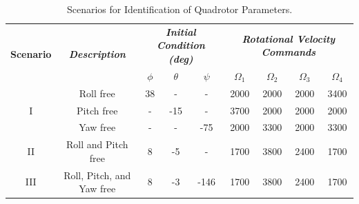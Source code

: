 \documentclass[3p,times]{elsarticle}
\begin{document}
\begin{table}[H]
	\caption{Scenarios for Identification of Quadrotor Parameters.}
	\centering
	\begin{tabular}{*{9}{c}}
	\toprule
	\multirow{2}{*}{\textbf{Scenario}} & \multirow{2}{*}{\textbf{\textit{Description}}}
	& \multicolumn{3}{c}{\textbf{\textit{Initial Condition (deg)}}} &
	\multicolumn{4}{c}{\textbf{\textit{Rotational Velocity Commands}}} \\
	\cmidrule(lr){3-5} \cmidrule(lr){6-9}
	& & $\phi$ & $\theta$ & $\psi$ & $\Omega_1$ & $\Omega_2$ & $\Omega_3$ & $\Omega_4$\\
	\midrule
	\multirow{3}{*}{I} & Roll free & 38 & - & - & 2000 & 2000 & 2000 & 3400\\
	& Pitch free & - & -15 & - & 3700 & 2000 & 2000 & 2000 \\
	& Yaw free & -& - &-75 & 2000 & 3300 & 2000 & 3300 \\
	\midrule
	II & Roll and Pitch free &8 & -5 & - & 1700 & 3800 & 2400 & 1700\\
	\midrule
	III & Roll, Pitch, and Yaw free &
	8 & -3 & -146 & 1700 & 3800 & 2400 & 1700 \\
	\bottomrule
	\end{tabular}
	\label{tab:identification}
	\end{table}
\end{document}
